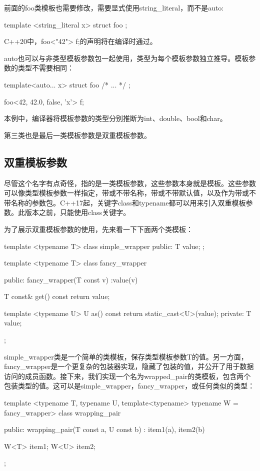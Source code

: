 前面的foo类模板也需要修改，需要显式使用string_literal，而不是auto:

\begin{cppcode}
template <string_literal x>
struct foo
{
};
\end{cppcode}

C++20中，foo<"42"> f;的声明将在编译时通过。

auto也可以与非类型模板参数包一起使用，类型为每个模板参数独立推导。模板参数的类型不需要相同：

\begin{cppcode}
template<auto... x>
struct foo
{ /* ... */ };

foo<42, 42.0, false, 'x'> f;
\end{cppcode}

本例中，编译器将模板参数的类型分别推断为int、double、bool和char。

第三类也是最后一类模板参数是双重模板参数。

\subsection{双重模板参数}

尽管这个名字有点奇怪，指的是一类模板参数，这些参数本身就是模板。这些参数可以像类型模板参数一样指定，带或不带名称，带或不带默认值，以及作为带或不带名称的参数包。C++17起，关键字class和typename都可以用来引入双重模板参数。此版本之前，只能使用class关键字。

为了展示双重模板参数的使用，先来看一下下面两个类模板：

\begin{cppcode}
template <typename T>
class simple_wrapper
{
public:
	T value;
};

template <typename T>
class fancy_wrapper
{
public:
	fancy_wrapper(T const v) :value(v)
	{
	}

	T const& get() const { return value; }
	
	template <typename U>
	U as() const
	{
		return static_cast<U>(value);
	}
private:
	T value;
};
\end{cppcode}

simple_wrapper类是一个简单的类模板，保存类型模板参数T的值。另一方面，fancy_wrapper是一个更复杂的包装器实现，隐藏了包装的值，并公开了用于数据访问的成员函数。接下来，我们实现一个名为wrapped_pair的类模板，包含两个包装类型的值。这可以是simple_wrapper，fancy_wrapper，或任何类似的类型：

\begin{cppcode}
template <typename T, typename U,
		  template<typename> typename W = fancy_wrapper>
class wrapping_pair
{
public:
	wrapping_pair(T const a, U const b) :
		item1(a), item2(b)
	{
	}

	W<T> item1;
	W<U> item2;
};
\end{cppcode}

